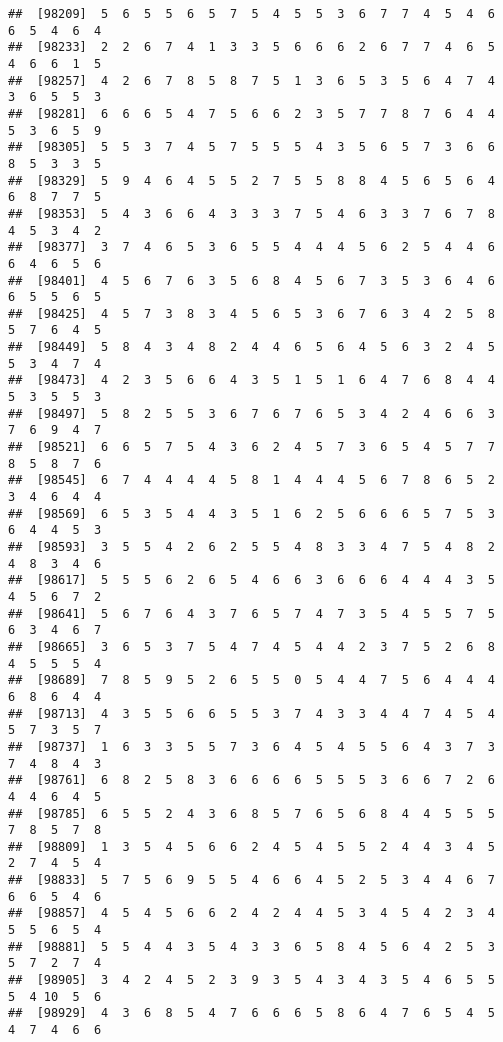 \documentclass[
]{book}
\begin{document}
\begin{verbatim}
##  [98209]  5  6  5  5  6  5  7  5  4  5  5  3  6  7  7  4  5  4  6  6  5  4  6  4
##  [98233]  2  2  6  7  4  1  3  3  5  6  6  6  2  6  7  7  4  6  5  4  6  6  1  5
##  [98257]  4  2  6  7  8  5  8  7  5  1  3  6  5  3  5  6  4  7  4  3  6  5  5  3
##  [98281]  6  6  6  5  4  7  5  6  6  2  3  5  7  7  8  7  6  4  4  5  3  6  5  9
##  [98305]  5  5  3  7  4  5  7  5  5  5  4  3  5  6  5  7  3  6  6  8  5  3  3  5
##  [98329]  5  9  4  6  4  5  5  2  7  5  5  8  8  4  5  6  5  6  4  6  8  7  7  5
##  [98353]  5  4  3  6  6  4  3  3  3  7  5  4  6  3  3  7  6  7  8  4  5  3  4  2
##  [98377]  3  7  4  6  5  3  6  5  5  4  4  4  5  6  2  5  4  4  6  6  4  6  5  6
##  [98401]  4  5  6  7  6  3  5  6  8  4  5  6  7  3  5  3  6  4  6  6  5  5  6  5
##  [98425]  4  5  7  3  8  3  4  5  6  5  3  6  7  6  3  4  2  5  8  5  7  6  4  5
##  [98449]  5  8  4  3  4  8  2  4  4  6  5  6  4  5  6  3  2  4  5  5  3  4  7  4
##  [98473]  4  2  3  5  6  6  4  3  5  1  5  1  6  4  7  6  8  4  4  5  3  5  5  3
##  [98497]  5  8  2  5  5  3  6  7  6  7  6  5  3  4  2  4  6  6  3  7  6  9  4  7
##  [98521]  6  6  5  7  5  4  3  6  2  4  5  7  3  6  5  4  5  7  7  8  5  8  7  6
##  [98545]  6  7  4  4  4  4  5  8  1  4  4  4  5  6  7  8  6  5  2  3  4  6  4  4
##  [98569]  6  5  3  5  4  4  3  5  1  6  2  5  6  6  6  5  7  5  3  6  4  4  5  3
##  [98593]  3  5  5  4  2  6  2  5  5  4  8  3  3  4  7  5  4  8  2  4  8  3  4  6
##  [98617]  5  5  5  6  2  6  5  4  6  6  3  6  6  6  4  4  4  3  5  4  5  6  7  2
##  [98641]  5  6  7  6  4  3  7  6  5  7  4  7  3  5  4  5  5  7  5  6  3  4  6  7
##  [98665]  3  6  5  3  7  5  4  7  4  5  4  4  2  3  7  5  2  6  8  4  5  5  5  4
##  [98689]  7  8  5  9  5  2  6  5  5  0  5  4  4  7  5  6  4  4  4  6  8  6  4  4
##  [98713]  4  3  5  5  6  6  5  5  3  7  4  3  3  4  4  7  4  5  4  5  7  3  5  7
##  [98737]  1  6  3  3  5  5  7  3  6  4  5  4  5  5  6  4  3  7  3  7  4  8  4  3
##  [98761]  6  8  2  5  8  3  6  6  6  6  5  5  5  3  6  6  7  2  6  4  4  6  4  5
##  [98785]  6  5  5  2  4  3  6  8  5  7  6  5  6  8  4  4  5  5  5  7  8  5  7  8
##  [98809]  1  3  5  4  5  6  6  2  4  5  4  5  5  2  4  4  3  4  5  2  7  4  5  4
##  [98833]  5  7  5  6  9  5  5  4  6  6  4  5  2  5  3  4  4  6  7  6  6  5  4  6
##  [98857]  4  5  4  5  6  6  2  4  2  4  4  5  3  4  5  4  2  3  4  5  5  6  5  4
##  [98881]  5  5  4  4  3  5  4  3  3  6  5  8  4  5  6  4  2  5  3  5  7  2  7  4
##  [98905]  3  4  2  4  5  2  3  9  3  5  4  3  4  3  5  4  6  5  5  5  4 10  5  6
##  [98929]  4  3  6  8  5  4  7  6  6  6  5  8  6  4  7  6  5  4  5  4  7  4  6  6

\end{verbatim}
\end{document}
